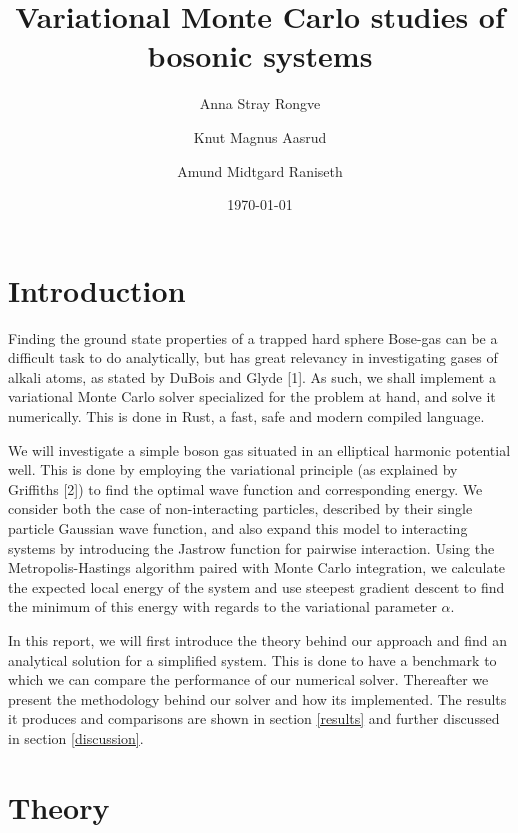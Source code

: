 \documentclass[
]{article}
\title{Variational Monte Carlo studies of bosonic systems}
\author{Anna Stray Rongve \and Knut Magnus Aasrud \and Amund Midtgard
Raniseth}
\date{\today}
\begin{document}
\maketitle

\begin{abstract}

\end{abstract}

\hypertarget{introduction}{%
\section{Introduction}\label{introduction}}

Finding the ground state properties of a trapped hard sphere Bose-gas
can be a difficult task to do analytically, but has great relevancy in
investigating gases of alkali atoms, as stated by DuBois and Glyde
{[}1{]}. As such, we shall implement a variational Monte Carlo solver
specialized for the problem at hand, and solve it numerically. This is
done in Rust, a fast, safe and modern compiled language.

We will investigate a simple boson gas situated in an elliptical
harmonic potential well. This is done by employing the variational
principle (as explained by Griffiths {[}2{]}) to find the optimal wave
function and corresponding energy. We consider both the case of
non-interacting particles, described by their single particle Gaussian
wave function, and also expand this model to interacting systems by
introducing the Jastrow function for pairwise interaction. Using the
Metropolis-Hastings algorithm paired with Monte Carlo integration, we
calculate the expected local energy of the system and use steepest
gradient descent to find the minimum of this energy with regards to the
variational parameter \(\alpha\).

In this report, we will first introduce the theory behind our approach
and find an analytical solution for a simplified system. This is done to
have a benchmark to which we can compare the performance of our
numerical solver. Thereafter we present the methodology behind our
solver and how its implemented. The results it produces and comparisons
are shown in section \ref{results} and further discussed in section
\ref{discussion}.

\hypertarget{theory}{%
\section{Theory}\label{theory}}
\end{document}
